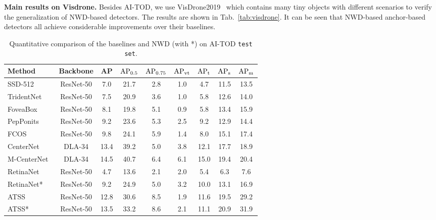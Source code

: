 \documentclass{article}
\begin{document}
\textbf{Main results on Visdrone.} Besides AI-TOD, we use VisDrone2019~\cite{visdrone2019_2019_iccvw} which contains many tiny objects with different scenarios to verify the generalization of NWD-based detectors. The results are shown in Tab.~\ref{tab:visdrone}. It can be seen that NWD-based anchor-based detectors all achieve considerable improvements over their baselines. 


\begin{table*}[t]
    \setlength{\belowcaptionskip}{0.1cm}
    \renewcommand{\arraystretch}{0.92}
    \caption{Quantitative comparison of the baselines and NWD (with *) on  AI-TOD {\tt test set}.}
	\centering
\begin{tabular}{|l|c|ccccccc|}  
	\hline
	 Method                                     & Backbone & AP & $\rm{AP_{0.5}}$ & $\rm{AP_{0.75}}$ & $\rm{AP_{vt}}$ & $\rm{AP_{t}}$ & $\rm{AP_{s}}$ & $\rm{AP_{m}}$\\
	\hline
SSD-512~\cite{SSD_2016_ECCV}        	    & ResNet-50 	& 7.0	& 21.7  & 2.8  & 1.0 & 4.7 & 11.5 & 13.5  \\
	 TridentNet~\cite{Trident-Net_2019_ICCV}      & ResNet-50 	    & 7.5	& 20.9  & 3.6  & 1.0 & 5.8 & 12.6 & 14.0   \\
	 FoveaBox~\cite{FoveaBox_2020_TIP}          & ResNet-50 	& 8.1	& 19.8  & 5.1  & 0.9 & 5.8 & 13.4  & 15.9  \\
	 PepPonits~\cite{RepPoints_2019_ICCV}       & ResNet-50 	& 9.2	& 23.6  & 5.3  & 2.5 & 9.2 & 12.9  & 14.4  \\
	 FCOS~\cite{FCOS_2019_ICCV}                 & ResNet-50 	& 9.8	& 24.1  & 5.9  & 1.4 & 8.0 & 15.1  & 17.4  \\
CenterNet~\cite{CenterNet_2019_arXiv}      & DLA-34            & 13.4  & 39.2  & 5.0  & 3.8 & 12.1 & 17.7 & 18.9  \\
	 M-CenterNet~\cite{AI-TOD_2020_ICPR}        & DLA-34            & 14.5  & 40.7  & 6.4  & 6.1 & 15.0 & 19.4 & 20.4  \\
\hline
	 RetinaNet~\cite{Focal-Loss_2017_ICCV}      & ResNet-50 	& 4.7	& 13.6  & 2.1  & 2.0 & 5.4 & 6.3  & 7.6   \\
	 RetinaNet*                                 & ResNet-50 	& 9.2	& 24.9  & 5.0  & 3.2 & 10.0 & 13.1  & 16.9   \\
	 \hline
	 ATSS~\cite{atss_2020_cvpr}                 & ResNet-50 	& 12.8	& 30.6  & 8.5  & 1.9 & 11.6 & 19.5 & 29.2   \\
	 ATSS*                                      & ResNet-50 	& 13.5	& 33.2  & 8.6  & 2.1 & 11.1 & 20.9 & 31.9   \\

\end{tabular}
\end{table*}
\end{document}
